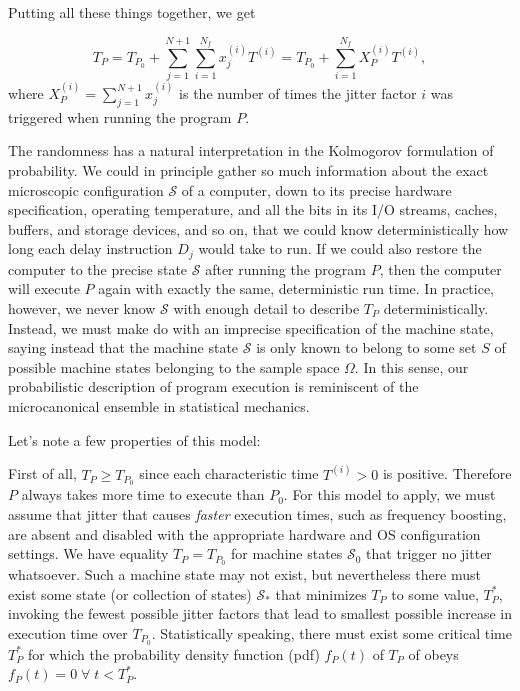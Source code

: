 \documentclass[conference]{IEEEtran}
\begin{document}
Putting all these things together, we get

\begin{equation}
T_P = T_{P_0} + \sum_{j=1}^{N+1} \sum_{i=1}^{N_f} x^{(i)}_j T^{(i)}
= T_{P_0} + \sum_{i=1}^{N_f} X_P^{(i)} T^{(i)},
\end{equation}
%
where $X_P^{(i)} = \sum_{j=1}^{N+1} x^{(i)}_j$ is the number of times the jitter factor $i$ was triggered when running the program $P$.

The randomness has a natural interpretation in the Kolmogorov formulation of probability. We could in principle gather so much information about the exact microscopic configuration $\mathcal S$ of a computer, down to its precise hardware specification, operating temperature, and all the bits in its I/O streams, caches, buffers, and storage devices, and so on, that we could know deterministically how long each delay instruction $D_j$ would take to run. If we could also restore the computer to the precise state $\mathcal S$ after running the program $P$, then the computer will execute $P$ again with exactly the same, deterministic run time. In practice, however, we never know $\mathcal S$ with enough detail to describe $T_P$ deterministically. Instead, we must make do with an imprecise specification of the machine state, saying instead that the machine state $\mathcal S$ is only known to belong to some set $S$ of possible machine states belonging to the sample space $\Omega$. In this sense, our probabilistic description of program execution is reminiscent of the microcanonical ensemble in statistical mechanics.

Let's note a few properties of this model:

First of all, $T_P \ge T_{P_0}$ since each characteristic time $T^{(i)} > 0$ is positive. Therefore $P$ always takes more time to execute than $P_0$.
For this model to apply, we must assume that jitter that causes \textit{faster}
execution times, such as frequency boosting, are absent and disabled with the
appropriate hardware and OS configuration settings. We have equality $T_P = T_{P_0}$
for machine states $\mathcal S_0$ that trigger no jitter whatsoever. Such a machine state may not exist, but nevertheless there must exist some state (or collection of states) $\mathcal S_*$ that minimizes $T_P$ to some value, $T^*_P$, invoking the fewest possible jitter factors that lead to smallest possible increase in execution time over $T_{P_0}$.
Statistically speaking, there must exist some critical time $T^*_P$ for which the probability density function (pdf) $f_P(t)$ of $T_P$ of obeys $f_P(t) = 0 \; \forall \; t < T^*_P$.
\end{document}
